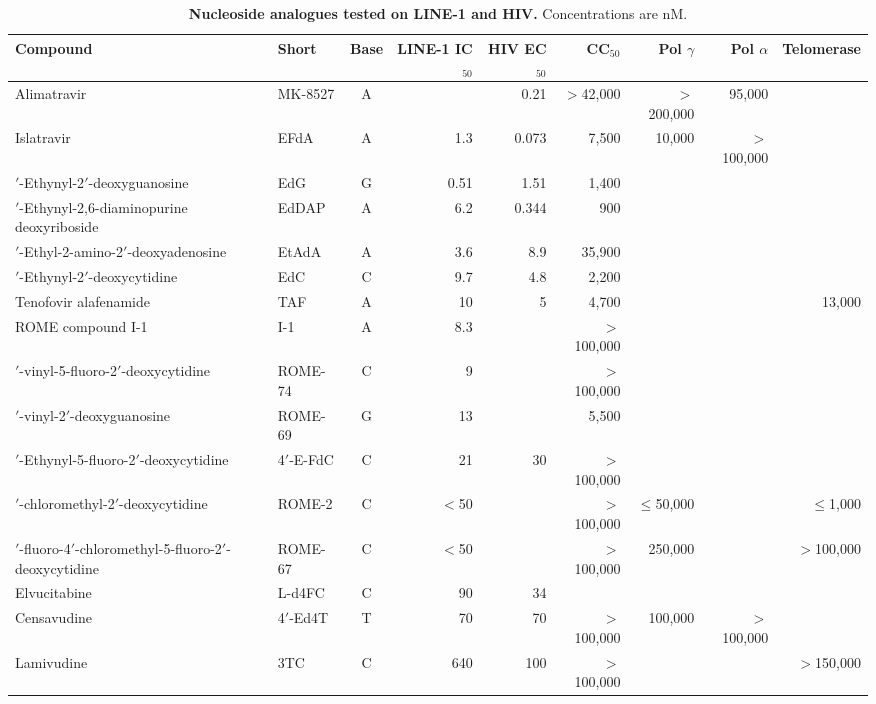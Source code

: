 \documentclass[11pt,twocolumn,twoside]{extarticle}
\begin{document}
\begin{table}[!t]
\caption{\textbf{Nucleoside analogues tested on LINE-1 and HIV.}
Concentrations are nM.}
\label{tab:nucleosides}
\vspace{0.25em}
\scriptsize
\setlength{\tabcolsep}{3.2pt}
\renewcommand{\arraystretch}{1.08}
\centering
\begin{tabular}{@{}>{\raggedright\arraybackslash}p{6.05cm} l c r r r r r r@{}}
\toprule
\textbf{Compound} & \textbf{Short} & \textbf{Base} & \textbf{LINE-1 IC$_{50}$} & \textbf{HIV EC$_{50}$} & \textbf{CC$_{50}$} & \textbf{Pol $\gamma$} & \textbf{Pol $\alpha$} & \textbf{Telomerase} \\
\midrule
Alimatravir & MK-8527 & A &  & 0.21 & $>$42,000 & $>$200,000 & 95,000 &  \\
Islatravir & EFdA & A & 1.3 & 0.073 & 7,500 & 10,000 & $>$100,000 &  \\
4$'$-Ethynyl-2$'$-deoxyguanosine & EdG & G & 0.51 & 1.51 & 1,400 &  &  &  \\
4$'$-Ethynyl-2,6-diaminopurine deoxyriboside & EdDAP & A & 6.2 & 0.344 & 900 &  &  &  \\
4$'$-Ethyl-2-amino-2$'$-deoxyadenosine & EtAdA & A & 3.6 & 8.9 & 35,900 &  &  &  \\
4$'$-Ethynyl-2$'$-deoxycytidine & EdC & C & 9.7 & 4.8 & 2,200 &  &  &  \\
Tenofovir alafenamide & TAF & A & 10 & 5 & 4,700 &  &  & 13,000 \\
ROME compound I-1 & I-1 & A & 8.3 &  & $>$100,000 &  &  &  \\
4$'$-vinyl-5-fluoro-2$'$-deoxycytidine & ROME-74 & C & 9 &  & $>$100,000 &  &  &  \\
4$'$-vinyl-2$'$-deoxyguanosine & ROME-69 & G & 13 &  & 5,500 &  &  &  \\
4$'$-Ethynyl-5-fluoro-2$'$-deoxycytidine & 4$'$-E-FdC & C & 21 & 30 & $>$100,000 &  &  &  \\
4$'$-chloromethyl-2$'$-deoxycytidine & ROME-2 & C & $<$50 &  & $>$100,000 & $\leq$50,000 &  & $\leq$1,000 \\
2$'$-fluoro-4$'$-chloromethyl-5-fluoro-2$'$-deoxycytidine & ROME-67 & C & $<$50 &  & $>$100,000 & 250,000 &  & $>$100,000 \\
Elvucitabine & L-d4FC & C & 90 & 34 &  &  &  &  \\
Censavudine & 4$'$-Ed4T & T & 70 & 70 & $>$100,000 & 100,000 & $>$100,000 &  \\
Lamivudine & 3TC & C & 640 & 100 & $>$100,000 &  &  & $>$150,000 \\

\end{tabular}
\end{table}
\end{document}
